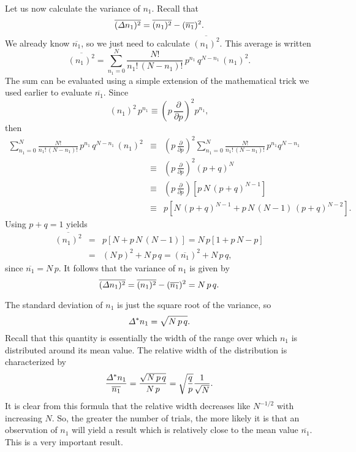 Let us now calculate the variance of $n_1$. Recall that
\begin{equation}
\overline{({\mit\Delta} n_1)^2}= \overline{(n_1)^2} - (\overline{n_1})^2.
\end{equation}
We already know $\overline{n_1}$, 
so we just need to calculate $\overline{(n_1)^2}$.
This average is written
\begin{equation}
\overline{(n_1)^2}=\sum_{n_1=0}^{N}\frac{N!}{n_1!\,(N-n_1)!}\,p^{n_1}\,
q^{N-n_1}\,(n_1)^2.
\end{equation}
The  sum can be evaluated using a simple extension  of the mathematical trick  
we used earlier to evaluate $\overline{n_1}$. Since
\begin{equation}
(n_1)^2 \,p^{n_1} \equiv \left(p\,\frac{\partial}{\partial p}\right)^2 p^{n_1},
\end{equation}
then
\begin{eqnarray}
\sum_{n_1=0}^{N}\frac{N!}{n_1!\,(N-n_1)!}\,p^{n_1}\,q^{N-n_1}\,(n_1)^2
&\equiv& \left(p\,\frac{\partial}{\partial p}\right)^2\sum_{n_1=0}^N
\frac{N!}{n_1!\,(N-n_1)!}\,p^{n_1}q^{N-n_1}\nonumber\\
&\equiv&  \left(p\,\frac{\partial}{\partial p}\right)^2(p+q)^N
\\
&\equiv&\left(p\,\frac{\partial}{\partial p}\right)\left[p\,N\, (p+q)^{N-1}\right]
\nonumber\\
&\equiv&p\left[N\,(p+q)^{N-1}+p\,N\,(N-1)\,(p+q)^{N-2}\right].\nonumber
\end{eqnarray}
Using  $p+q=1$ yields
\begin{eqnarray}
\overline{(n_1)^2}&=& p\left[N+p\,N\,(N-1)\right]= N\,p\left[1+p\,N-p\right]\nonumber\\
&=& (N\,p)^2 + N\,p\,q = (\overline{n_1})^2 + N\,p\,q,
\end{eqnarray}
since $\overline{n_1}= N\,p$. It follows that the variance
of $n_1$ is given by
\begin{equation}
\overline{({\mit\Delta} n_1)^2}= \overline{(n_1)^2}- (\overline{n_1})^2 = N\,p\,q.
\end{equation}

The standard deviation of $n_1$ is just the square root of the variance, so
\begin{equation}
{\mit\Delta}^\ast n_1 = \sqrt{N\,p\,q}.
\end{equation}
Recall that this quantity is essentially the width of the range over which
$n_1$ is distributed around its mean value. The relative width of the
distribution is characterized by
\begin{equation}
\frac{{\mit\Delta}^\ast n_1}{\overline{n_1}}= \frac{\sqrt{N \,p\,q}}{N\,p} =
\sqrt{\frac{q}{p}}\frac{1}{\sqrt{N}}.
\end{equation}
It is clear from this formula that the relative width decreases like
$N^{-1/2}$ with increasing $N$. So, the greater the number of trials, the
more likely it is that an observation of $n_1$ will yield a result
which is relatively close to the mean value $\overline{n_1}$. This
is a very important result.

